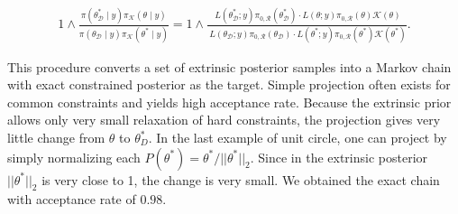 \documentclass[10pt]{article}
\newcommand{\mc}[1]{\mathcal{#1}}
\DeclareMathOperator{\1}{\mathbbm{1}}
\begin{document}
\begin{equation}
 \begin{aligned}
 1 \wedge \frac{\pi(\theta^*_{\mc D} \mid y) \pi_{\mc K}(\theta  \mid y) }{\pi(\theta_{\mc D}  \mid y)\pi_{\mc K}(\theta^* \mid y)} =  1 \wedge \frac{\ L(\theta^*_{\mc D};y)\pi_{0,\mc R}(\theta^*_{\mc D})  \cdot    L(\theta;y)\pi_{0,\mc R}(\theta)   \mc K(\theta)}{\ L(\theta_{\mc D};y)\pi_{0,\mc R}(\theta_{\mc D})   \cdot L(\theta^*;y)\pi_{0,\mc R}(\theta^*)   \mc K(\theta^{*})}.
 \end{aligned}
 \end{equation}
 
 This procedure converts a set of extrinsic posterior samples into a Markov chain with exact constrained posterior as the target. Simple projection often exists for common constraints and yields high acceptance rate. Because the extrinsic prior allows only very small relaxation of hard constraints, the projection gives very little change from $\theta$ to $\theta^*_D$. In the last example of unit circle, one can project by simply normalizing each $P(\theta^*) = \theta^*/||\theta^{*}||_2$. Since in the extrinsic posterior $||\theta^{*}||_2$ is very close to 1, the change is very small. We obtained the exact chain with acceptance rate of $0.98$.
 


\end{document}
